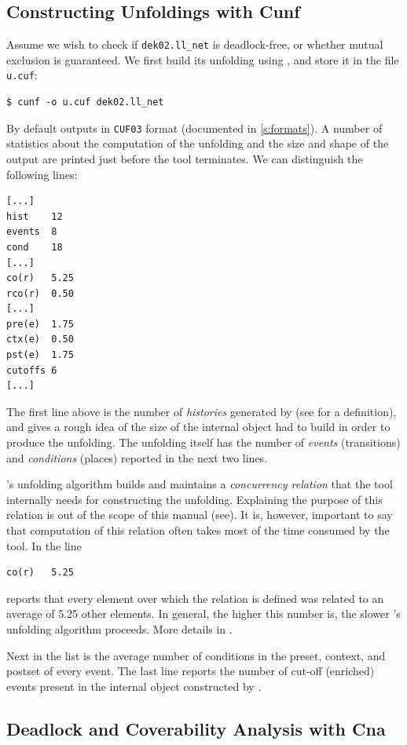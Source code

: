 \documentclass[a4paper]{refart}
\begin{document}
\subsection{Constructing Unfoldings with Cunf}%
\label{s:constructing}

Assume we wish to check if \verb!dek02.ll_net!
is deadlock-free, or whether mutual exclusion is guaranteed.
We first build its unfolding using \cunf,
and store it in the file \verb!u.cuf!:
\begin{verbatim}
$ cunf -o u.cuf dek02.ll_net
\end{verbatim}
By default \cunf outputs in \verb!CUF03! format
(documented in \cref{s:formats}).
A number of statistics about the computation of the unfolding
and the size and shape of the output are printed
just before the tool terminates.
We can distinguish the following lines:
\begin{verbatim}
[...]
hist    12
events  8
cond    18
[...]
co(r)   5.25
rco(r)  0.50
[...]
pre(e)  1.75
ctx(e)  0.50
pst(e)  1.75
cutoffs 6
[...]
\end{verbatim}
The first line above is the number of \emph{histories} generated by \cunf
(see\cite{BBCKRS12} for a definition), and gives a rough idea
of the size of the internal object \cunf had to build in order to produce the
unfolding.
The unfolding itself has the number of \emph{events} (transitions)
and \emph{conditions} (places)
reported in the next two lines.

\cunf's unfolding algorithm builds and maintains a \emph{concurrency relation}
that the tool internally needs for constructing the unfolding.
Explaining the purpose of this relation is out
of the scope of this manual (see\cite{BBCKRS12}).
It is, however, important to say that computation of this relation often takes
most of the time consumed by the tool.  In the line
\begin{verbatim}
co(r)   5.25
\end{verbatim}
\cunf reports that every element over which the relation is
defined was related to an average of 5.25 other elements.
In general, the higher this number is, the slower \cunf's unfolding
algorithm proceeds.
More details in \cite[section 7]{BBCKRS12}.

Next in the list is the average number of conditions in the 
preset, context, and postset of every event.  The last line reports
the number of cut-off (enriched) events present in the internal object
constructed by \cunf.

\subsection{Deadlock and Coverability Analysis with Cna}%
\label{s:deadlock}
\end{document}
